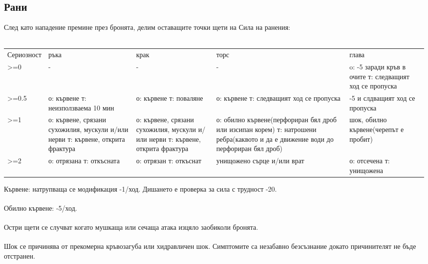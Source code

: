 \subsection{Рани}
След като нападение премине през бронята, делим оставащите точки щети на Сила на ранения:
\\
\\
\begin{tabular}{ p{3cm} | p{3cm} | p{3cm} | p{3cm} | p{3cm} }
Сериозност & ръка                                                                             & крак                                                                            & торс                                     & глава                                                   \\
>=0        & -                                                                                & -                                                                               & -                                        & o: -5 заради кръв в очите т: следващият ход се пропуска \\
>=0.5      & о: кървене т: неизползваема 10 мин                                               & о: кървене т: поваляне                                                          & о: кървене т: следващият ход се пропуска & -5 и слдващият ход се пропуска     \\
>=1        & о: кървене, срязани сухожилия, мускули и/или нерви т: кървене, открита фрактура  & о: кървене, срязани сухожилия, мускули и/или нерви т: кървене, открита фрактура & о: обилно кървене(перфориран бял дроб или изсипан корем) т: натрошени ребра(каквото и да е движение води до перфориран бял дроб)                 & шок, обилно кървене(черепът е пробит) \\
>=2        & о: отрязана т: откъсната                                                         & о: отрязан т: откъснат                                                          & унищожено сърце и/или врат                                                       & о: отсечена т: унищожена \\
\end{tabular}

Кървене: натрупваща се модификация -1/ход.
Дишането е проверка за сила с трудност -20.
\\
\\
Обилно кървене: -5/ход.
\\
\\
Остри щети се случват когато мушкаща или сечаща атака изцяло заобиколи бронята.
\\
\\
Шок се причинява от прекомерна кръвозагуба или хидравличен шок.
Симптомите са незабавно безсъзнание докато причинителят не бъде отстранен.



